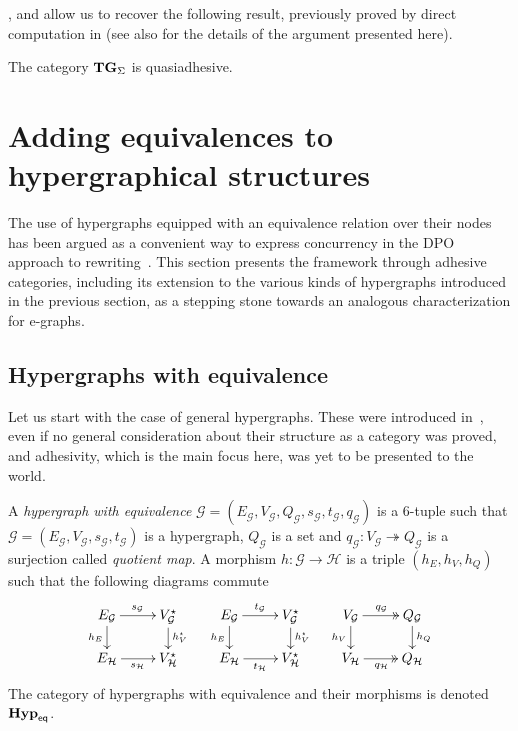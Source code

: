 \documentclass[3p]{elsarticle}
\newcommand{\catname}[1]{\textbf{\textup{#1}}}
\newcommand{\EqHyp}{\catname{Hyp}_{\mathsf{eq}}} %
\newcommand{\tg}[0]{\catname{TG}_{\Sigma}}
\newcommand{\eto}{\twoheadrightarrow}
\theoremstyle{remark}
\theoremstyle{definition}
\begin{document}
,  and  allow us to recover the following result, previously proved by direct computation in \cite[Thm.~4.2]{CorradiniG05} (see also \cite[Cor.~5.15]{CastelnovoGM24} for the details of the argument presented here).
\begin{cor}\label{cor:term}
	The category $\tg$ is quasiadhesive.
\end{cor}
\fi 
\section{Adding equivalences to hypergraphical structures}
\label{hypereq}
The use of hypergraphs equipped with an equivalence relation over their nodes has been argued as a convenient way to express concurrency in the DPO approach to rewriting~\cite{concur2006}.
This section presents the framework through adhesive categories, including its extension to the various kinds of hypergraphs introduced in the previous section, as a stepping stone towards an analogous characterization for e-graphs.

\subsection{Hypergraphs with equivalence}

Let us start with the case of general hypergraphs. These were introduced in~\cite{concur2006}, even if no general consideration about their structure as a category was proved, and adhesivity, 
which is the main focus here, was yet to be presented to the world.

\begin{defi}
	A \emph{hypergraph with equivalence} $\mathcal{G} = (E_\mathcal{G}, V_{\mathcal{G}}, Q_\mathcal{G}, s_\mathcal{G}, t_\mathcal{G}, q_\mathcal{G})$ is a 6-tuple such that $\mathcal{G} = (E_\mathcal{G}, V_{\mathcal{G}}, s_\mathcal{G}, t_\mathcal{G})$ is a hypergraph, $Q_\mathcal{G}$ is a set and $q_{\mathcal{G}}: V_{\mathcal{G}}\eto Q_{\mathcal{G}}$ is a surjection called \emph{quotient map}. 
	A morphism $h\colon \mathcal{G\to H}$ is a triple $(h_E, h_V, h_Q)$ such that the following diagrams commute
	\[\xymatrix@R=15pt{
		{E_\mathcal{G}}\ar[r]^{s_\mathcal{G}}\ar[d]_{h_E} & {V_{\mathcal{G}}^\star}\ar[d]^{h_V^\star} & {E_\mathcal{G}}\ar[r]^{t_\mathcal{G}}\ar[d]_{h_E} & {V_{\mathcal{G}}^\star}\ar[d]^{h_V^\star} & {V_\mathcal{G}}\ar@{>>}[r]^{q_\mathcal{G}}\ar[d]_{h_V} & {Q_{\mathcal{G}}} \ar[d]^{h_Q} \\
		{E_\mathcal{H}}\ar[r]_{s_\mathcal{H}} & {V_{\mathcal{H}}^\star}	& {E_\mathcal{H}}\ar[r]_{t_\mathcal{H}} & {V_{\mathcal{H}}^\star}& {V_\mathcal{H}}\ar@{>>}[r]_{q_\mathcal{H}} & {Q_\mathcal{H}}
	}\]
	The category of hypergraphs with equivalence and their morphisms is denoted $\EqHyp$.
	
\end{defi}
\end{document}
